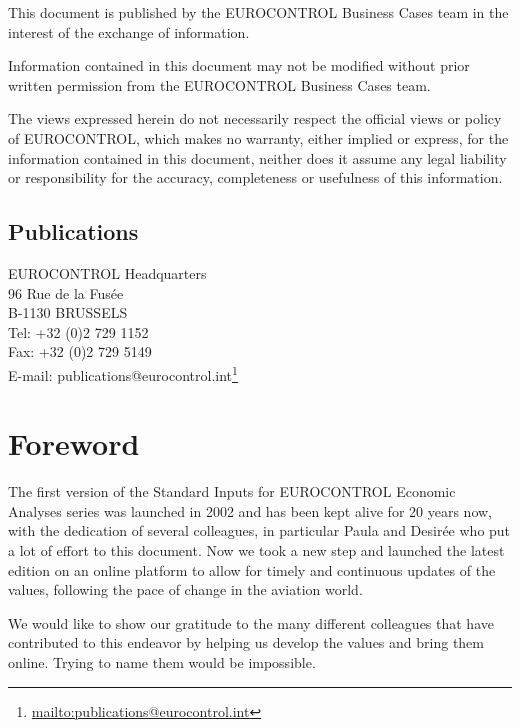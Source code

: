 \documentclass[
  11pt,
  a4paper,
]{book}
\DeclareRobustCommand{\href}[2]{#2\footnote{\url{#1}}}
\begin{document}
This document is published by the EUROCONTROL Business Cases team in the
interest of the exchange of information.

Information contained in this document may not be modified without prior
written permission from the EUROCONTROL Business Cases team.

The views expressed herein do not necessarily respect the official views
or policy of EUROCONTROL, which makes no warranty, either implied or
express, for the information contained in this document, neither does it
assume any legal liability or responsibility for the accuracy,
completeness or usefulness of this information.

\hypertarget{publications}{%
\section*{Publications}\label{publications}}


EUROCONTROL Headquarters\\
96 Rue de la Fusée\\
B-1130 BRUSSELS\\
Tel: +32 (0)2 729 1152\\
Fax: +32 (0)2 729 5149\\
E-mail:
\href{mailto:publications@eurocontrol.int}{publications@eurocontrol.int}


\hypertarget{foreword}{%
\chapter*{Foreword}\label{foreword}}


The first version of the Standard Inputs for EUROCONTROL Economic
Analyses series was launched in 2002 and has been kept alive for 20
years now, with the dedication of several colleagues, in particular
Paula and Desirée who put a lot of effort to this document. Now we took
a new step and launched the latest edition on an online platform to
allow for timely and continuous updates of the values, following the
pace of change in the aviation world.

We would like to show our gratitude to the many different colleagues
that have contributed to this endeavor by helping us develop the values
and bring them online. Trying to name them would be impossible.
\end{document}
